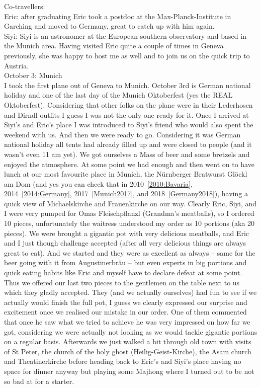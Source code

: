 Co-travellers:\\
Eric: after graduating Eric took a postdoc at the Max-Planck-Institute in Garching and moved to Germany, great to catch up with him again.\\

Siyi: Siyi is an astronomer at the European southern observatory and based in the Munich area. Having visited Eric quite a couple of times in Geneva previously, she was happy to host me as well and to join us on the quick trip to Austria.\\

October 3: Munich\\
I took the first plane out of Geneva to Munich. October 3rd is German national holiday and one of the last day of the Munich Oktoberfest (yes the REAL Oktoberfest). Considering that other folks on the plane were in their Lederhosen and Dirndl outfits I guess I was not the only one ready for it. Once I arrived at Siyi's and Eric's place I was introduced to Siyi's friend who would also spent the weekend with us. And then we were ready to go. Considering it was German national holiday all tents had already filled up and were closed to people (and it wasn't even 11 am yet). We got ourselves a Mass of beer and some bretzels and enjoyed the atmosphere. At some point we had enough and then went on to have lunch at our most favourite place in Munich, the N\"urnberger Bratwurst Gl\"ockl am Dom (and yes you can check that in 2010~\ref{2010:Bavaria}, 2014~\ref{2014:Germany}, 2017~\ref{Munich2017}, and 2018~\ref{Germany2018}), having a quick view of Michaelskirche and Frauenkirche on our way. Clearly Eric, Siyi, and I were very pumped for Omas Fleischpflanzl (Grandma's meatballs), so I ordered 10 pieces, unfortunately the waitress understood my order as 10 portions (aka 20 pieces). We were brought a gigantic pot with very delicious meatballs, and Eric and I just though challenge accepted (after all very delicious things are always great to eat). And we started and they were as excellent as always -- same for the beer going with it from Augustinerbr\"au -- but even experts in big portions and quick eating habits like Eric and myself have to declare defeat at some point. Thus we offered our last two pieces to the gentlemen on the table next to us which they gladly accepted. They (and we actually ourselves) had fun to see if we actually would finish the full pot, I guess we clearly expressed our surprise and excitement once we realised our mistake in our order. One of them commented that once he saw what we tried to achieve he was very impressed on how far we got, considering we were actually not looking as we would tackle gigantic portions on a regular basis. Afterwards we just walked a bit through old town with visits of St Peter, the church of the holy ghost (Heilig-Geist-Kirche), the Asam church and Theatinerkirche before heading back to Eric's and Siyi's place having no space for dinner anyway but playing some Majhong where I turned out to be not so bad at for a starter.\\

